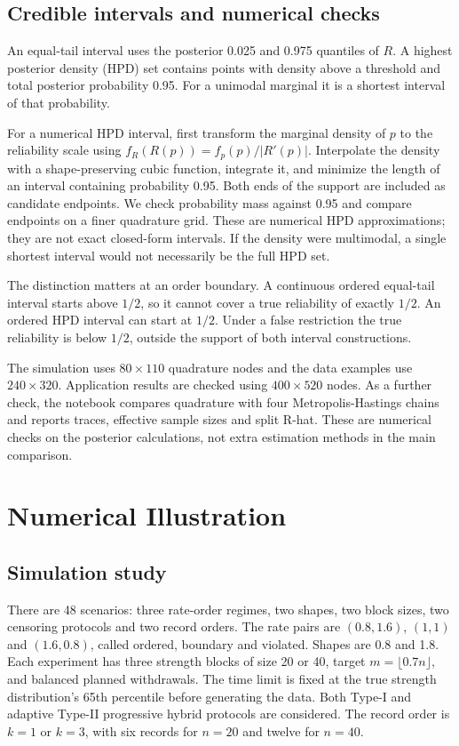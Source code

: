 \documentclass[a4paper,11pt]{article}
\begin{document}
\subsection{Credible intervals and numerical checks}\label{sec:credible}
An equal-tail interval uses the posterior 0.025 and 0.975 quantiles of $R$. A highest posterior density (HPD) set contains points with density above a threshold and total posterior probability 0.95. For a unimodal marginal it is a shortest interval of that probability.

For a numerical HPD interval, first transform the marginal density of $p$ to the reliability scale using $f_R(R(p))=f_p(p)/|R'(p)|$. Interpolate the density with a shape-preserving cubic function, integrate it, and minimize the length of an interval containing probability 0.95. Both ends of the support are included as candidate endpoints. We check probability mass against 0.95 and compare endpoints on a finer quadrature grid. These are numerical HPD approximations; they are not exact closed-form intervals. If the density were multimodal, a single shortest interval would not necessarily be the full HPD set.

The distinction matters at an order boundary. A continuous ordered equal-tail interval starts above $1/2$, so it cannot cover a true reliability of exactly $1/2$. An ordered HPD interval can start at $1/2$. Under a false restriction the true reliability is below $1/2$, outside the support of both interval constructions.

The simulation uses $80\times110$ quadrature nodes and the data examples use $240\times320$. Application results are checked using $400\times520$ nodes. As a further check, the notebook compares quadrature with four Metropolis-Hastings chains and reports traces, effective sample sizes and split R-hat. These are numerical checks on the posterior calculations, not extra estimation methods in the main comparison.

\section{Numerical Illustration}\label{sec:numerical}
\subsection{Simulation study}\label{sec:simulation}
There are 48 scenarios: three rate-order regimes, two shapes, two block sizes, two censoring protocols and two record orders. The rate pairs are $(0.8,1.6)$, $(1,1)$ and $(1.6,0.8)$, called ordered, boundary and violated. Shapes are 0.8 and 1.8. Each experiment has three strength blocks of size 20 or 40, target $m=\lfloor0.7n\rfloor$, and balanced planned withdrawals. The time limit is fixed at the true strength distribution's 65th percentile before generating the data. Both Type-I and adaptive Type-II progressive hybrid protocols are considered. The record order is $k=1$ or $k=3$, with six records for $n=20$ and twelve for $n=40$.
\end{document}
